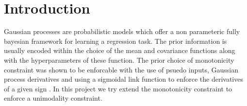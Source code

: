 \section{Introduction}
Gaussian processes are probabilistic models which offer a non parameteric fully bayesian framework for learning a regression task. The prior information is usually encoded within the choice of the mean and covariance functions along with the hyperparameters of these function. The prior choice of monotonicity constraint was shown to be enforcable with the use of psuedo inputs, Gaussian process derivatives and using a sigmoidal link function to enforce the derivatives of a given sign \cite{JaaAki10}. In this project we try extend the monotonicity constraint to enforce a unimodality constraint. 